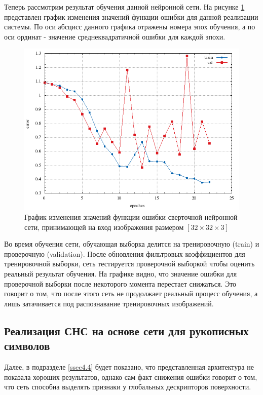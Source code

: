 \documentclass[14pt]{article}
\numberwithin{figure}{section}
\numberwithin{equation}{section}
\begin{document}
Теперь рассмотрим результат обучения данной нейронной сети. На рисунке \ref{ris:10} представлен график изменения значений функции ошибки для данной реализации системы. По оси абсцисс данного графика отражены номера эпох обучения, а по оси ординат - значение среднеквадратичной ошибки для каждой эпохи.

\begin{figure}[h]
   \begin{center}
       \includegraphics[scale=0.95] {10.JPG}
       \caption{График изменения значений функции ошибки сверточной нейронной сети, принимающей на вход изображения размером $[32 \times 32 \times 3]$}
       \label{ris:10}
   \end{center}
\end{figure}

Во время обучения сети, обучающая выборка делится на тренировочную (train) и проверочную (validation). После обновления фильтровых коэффициентов для тренировочной выборки, сеть тестируется проверочной выборкой чтобы оценить реальный результат обучения. На графике видно, что значение ошибки для проверочной выборки после некоторого момента перестает снижаться. Это говорит о том, что после этого сеть не продолжает реальный процесс обучения, а лишь затачивается под распознавание тренировочных изображений.

\subsection{Реализация СНС на основе сети для рукописных символов}\label{ssec4.3}

Далее, в подразделе \ref{ssec4.4} будет показано, что представленная архитектура не показала хороших результатов, однако сам факт снижения ошибки говорит о том, что сеть способна выделять признаки у глобальных дескрипторов поверхности.
\end{document}
